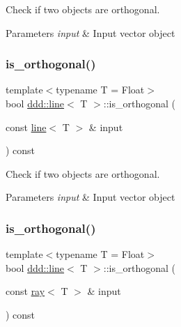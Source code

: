 Check if two objects are orthogonal. 


\begin{DoxyParams}{Parameters}
{\em input} & Input vector object \\
\hline
\end{DoxyParams}
\mbox{\label{classddd_1_1line_a31170f8f74362954dc35ae189ba64984}} 
\subsubsection{\texorpdfstring{is\+\_\+orthogonal()}{is\_orthogonal()}\hspace{0.1cm}{\footnotesize\ttfamily [2/5]}}
{\footnotesize\ttfamily template$<$typename T = Float$>$ \\
bool \hyperlink{classddd_1_1line}{ddd\+::line}$<$ T $>$\+::is\+\_\+orthogonal (\begin{DoxyParamCaption}\item[{const \hyperlink{classddd_1_1line}{line}$<$ T $>$ \&}]{input }\end{DoxyParamCaption}) const\hspace{0.3cm}{\ttfamily [inline]}}



Check if two objects are orthogonal. 


\begin{DoxyParams}{Parameters}
{\em input} & Input vector object \\
\hline
\end{DoxyParams}
\mbox{\label{classddd_1_1line_a3f836658151a55ad7f88dce40a975c3a}} 
\subsubsection{\texorpdfstring{is\+\_\+orthogonal()}{is\_orthogonal()}\hspace{0.1cm}{\footnotesize\ttfamily [3/5]}}
{\footnotesize\ttfamily template$<$typename T = Float$>$ \\
bool \hyperlink{classddd_1_1line}{ddd\+::line}$<$ T $>$\+::is\+\_\+orthogonal (\begin{DoxyParamCaption}\item[{const \hyperlink{classddd_1_1ray}{ray}$<$ T $>$ \&}]{input }\end{DoxyParamCaption}) const\hspace{0.3cm}{\ttfamily [inline]}}



